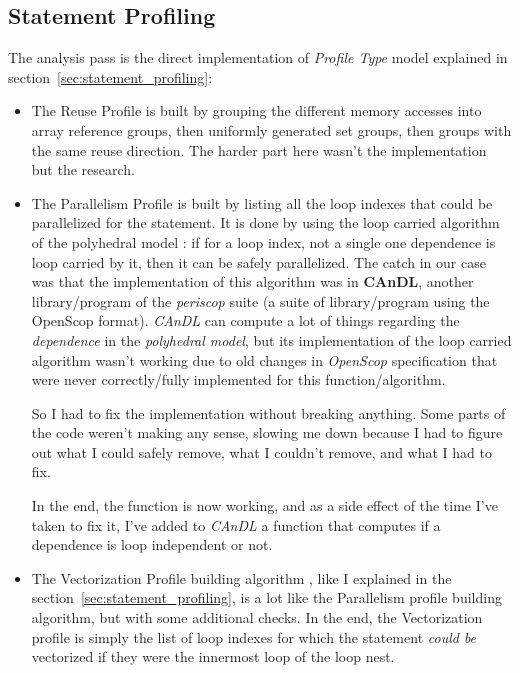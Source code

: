 \documentclass[paper=a4, fontsize=11.5pt]{scrartcl}
\numberwithin{equation}{section}        %
\numberwithin{figure}{section}          %
\numberwithin{table}{section}               %
\begin{document}
    \subsection{Statement Profiling}
    The analysis pass is the direct implementation of \textit{Profile Type} model explained in section~\ref{sec:statement_profiling}:
    \begin{itemize}
        \item The Reuse Profile is built by grouping the
            different memory accesses into array reference groups, then uniformly generated set groups,
            then groups with the same reuse direction. The harder part here wasn't the
            implementation but the research.

        \item The Parallelism Profile is built by listing all the loop indexes that could be
            parallelized for the statement. It is done by using the loop carried algorithm
            of the polyhedral model : if for a loop index, not a single one dependence is
            loop carried by it, then it can be safely parallelized.
            The catch in our case was that the implementation of this algorithm was in
            \textbf{CAnDL}, another library/program of the \textit{periscop} suite (a suite of
            library/program using the OpenScop format). \textit{CAnDL} can compute
            a lot of things regarding the \textit{dependence} in the \textit{polyhedral model},
            but its implementation of the loop carried algorithm wasn't working due to old
            changes in \textit{OpenScop} specification that were never correctly/fully implemented
            for this function/algorithm.
            
            So I had to fix the implementation without breaking anything.
            Some parts of the code weren't making any sense, slowing me down because I had
            to figure out what I could safely remove, what I couldn't remove, and what I
            had to fix.

            In the end, the function is now working, and as a side effect of the time I've taken
            to fix it, I've added to \textit{CAnDL} a function that computes if a dependence
            is loop independent or not.
        \item The Vectorization Profile building algorithm
            , like I explained in the section~\ref{sec:statement_profiling}, is a lot like
            the Parallelism profile building algorithm, but with some additional checks.
            In the end, the Vectorization profile is simply the list of loop indexes for which
            the statement \textit{could be} vectorized if they were the innermost loop of the loop nest.\\


\end{itemize}
\end{document}
